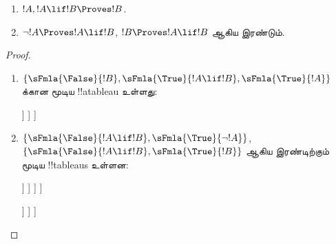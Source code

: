 \documentclass[../../../include/open-logic-section]{subfiles}
\begin{document}
\begin{prop}
  \begin{enumerate}
  \item {} $!A, !A \lif !B \Proves !B$.
  \item {}
    $\lnot !A \Proves !A \lif !B$, $!B \Proves !A \lif !B$ ஆகிய இரண்டும்.
  \end{enumerate}
\end{prop}

\begin{proof}
  \begin{enumerate}
    \item $\{\sFmla{\False}{!B}, \sFmla{\True}{!A \lif !B},
      \sFmla{\True}{!A}\}$ க்கான மூடிய !!a{tableau} உள்ளது:
      \begin{oltableau}
        [\sFmla{\False}{\formula{B}}, just=\TAss
          [\sFmla{\True}{\formula{A} \lif \formula{B}}, just=\TAss
            [\sFmla{\True}{\formula{A}}, just=\TAss
              [\sFmla{\False}{\formula{A}}, just = {\TRule{\True}{\lif}[2]}, close]
              [\sFmla{\True}{\formula{B}}, just = {\TRule{\True}{\lif}[2]}, close]
            ]
          ]
        ]
      \end{oltableau}
    \item $\{\sFmla{\False}{!A \lif !B},
      \sFmla{\True}{\lnot !A}\}$, $\{\sFmla{\False}{!A \lif !B},
      \sFmla{\True}{!B}\}$ ஆகிய இரண்டிற்கும் மூடிய !!{tableau}s உள்ளன:
      \begin{oltableau}
        [\sFmla{\False}{\formula{A} \lif \formula{B}}, just = \TAss
          [\sFmla{\True}{\lnot \formula{A}}, just = \TAss
            [\sFmla{\True}{\formula{A}}, just = {\TRule{\False}{\lif}[1]}
              [\sFmla{\False}{\formula{B}}, just = {\TRule{\False}{\lif}[1]}
                [\sFmla{\False}{\formula{A}}, just = {\TRule{\True}{\lnot}[2]}, close]
              ]
            ]
          ]
        ]
      \end{oltableau}
      \begin{oltableau}
        [\sFmla{\False}{\formula{A} \lif \formula{B}}, just = \TAss
          [\sFmla{\True}{\formula{B}}, just = \TAss
            [\sFmla{\True}{\formula{A}}, just = {\TRule{\False}{\lif}[1]}
              [\sFmla{\False}{\formula{B}}, just = {\TRule{\False}{\lif}[1]},close
              ]
            ]
          ]
        ]
      \end{oltableau}
  \end{enumerate}
\end{proof}
\end{document}
